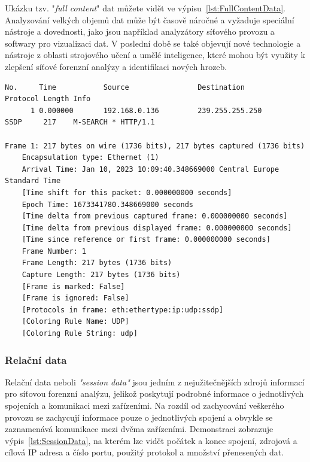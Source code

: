     Ukázku tzv. "\textit{full content}" dat můžete vidět ve výpisu~\ref{lst:FullContentData}. Analyzování velkých objemů dat může být časově náročné a vyžaduje speciální nástroje a dovednosti, jako jsou například analyzátory síťového provozu a softwary pro vizualizaci dat. V poslední době se také objevují nové technologie a nástroje z oblasti strojového učení a umělé inteligence, které mohou být využity k zlepšení síťové forenzní analýzy a identifikaci nových hrozeb.
    \begin{lstlisting}[caption={Zkrácená ukázka zachyceného paketu pomocí jednoho z nejrozšiřenějších nástroju Wireshark.}, label={lst:FullContentData}, breaklines]
No.     Time           Source                Destination           Protocol Length Info
      1 0.000000       192.168.0.136         239.255.255.250       SSDP     217    M-SEARCH * HTTP/1.1 

Frame 1: 217 bytes on wire (1736 bits), 217 bytes captured (1736 bits)
    Encapsulation type: Ethernet (1)
    Arrival Time: Jan 10, 2023 10:09:40.348669000 Central Europe Standard Time
    [Time shift for this packet: 0.000000000 seconds]
    Epoch Time: 1673341780.348669000 seconds
    [Time delta from previous captured frame: 0.000000000 seconds]
    [Time delta from previous displayed frame: 0.000000000 seconds]
    [Time since reference or first frame: 0.000000000 seconds]
    Frame Number: 1
    Frame Length: 217 bytes (1736 bits)
    Capture Length: 217 bytes (1736 bits)
    [Frame is marked: False]
    [Frame is ignored: False]
    [Protocols in frame: eth:ethertype:ip:udp:ssdp]
    [Coloring Rule Name: UDP]
    [Coloring Rule String: udp]
    \end{lstlisting}
    \subsubsection*{Relační data}
    
    Relační data neboli \textit{"session data"} jsou jedním z nejužitečnějších zdrojů informací pro síťovou forenzní analýzu, jelikož poskytují podrobné informace o jednotlivých spojeních a komunikaci mezi zařízeními. Na rozdíl od zachycování veškerého provozu se zachycují informace pouze \newline o jednotlivých spojení a obvykle se zaznamenává komunikace mezi dvěma zařízeními. Demonstraci zobrazuje výpis~\ref{lst:SessionData}, na kterém lze vidět počátek a konec spojení, zdrojová a cílová \gls{IP} adresa a číslo portu, použitý protokol a množství přenesených dat. 
    

